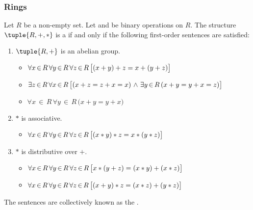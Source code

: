 \subsubsection{Rings}
\begin{dfn}
    \label{dfn:ring}
    Let \( R \) be a non-empty set. Let  and  be binary operations on \( R \).
    The structure \( \tuple{R, +, \ast} \) is a  if and only if the following first-order sentences are satisfied:
    \begin{enumerate}[topsep=2pt,noitemsep,label=\textup{\texttt{(\alph*)}}]
        \item \( \tuple{R, +} \) is an abelian group.
            \begin{itemize}
                \setlength{\itemsep}{0.1em}
                \item \( \forall x\,{\in}\,R \, \forall y\,{\in}\,R \, \forall z\,{\in}\,R \, \big[ \mleft( x + y \mright) + z = x + \mleft( y + z \mright) \big] \)
                \item \( \exists z\,{\in}\,R \, \forall x\,{\in}\,R \, \big[ \mleft( x + z = z + x = x \mright)
                       \,\,{\land}\,\,
                       \exists y\,{\in}\,R \, \mleft( x + y = y + x = z \mright) \big] \)
                \item \( \forall x\,{\in}\,R \, \forall y\,{\in}\,R \, \big( x + y = y + x \big) \)
            \end{itemize} \label{enum:ring-R-plus-forms-abelian-group}
        \item \( \ast \) is associative.
            \begin{itemize}
                \item \( \forall x\,{\in}\,R \, \forall y\,{\in}\,R \, \forall z\,{\in}\,R \, \big[ \mleft( x \ast y \mright) \ast z = x \ast \mleft( y \ast z \mright) \big] \)
            \end{itemize} \label{enum:ring-star-is-associative}
        \item \( \ast \) is distributive over \( + \).
            \begin{itemize}
                \setlength{\itemsep}{0.1em}
                \item \( \forall x\,{\in}\,R \, \forall y\,{\in}\,R \, \forall z\,{\in}\,R \,
                         \big[ x \ast \mleft( y + z \mright) = \mleft( x \ast y \mright) + \mleft( x \ast z \mright) \big]\)
                \item \( \forall x\,{\in}\,R \, \forall y\,{\in}\,R \, \forall z\,{\in}\,R \,
                         \big[ \mleft( x + y \mright) \ast z = \mleft( x \ast z \mright) + \mleft( y \ast z \mright) \big]\)
            \end{itemize} \label{enum:ring-star-distributes-over-plus}
    \end{enumerate}
    The sentences  are collectively known as the .
\end{dfn}

